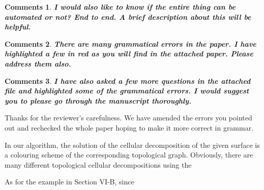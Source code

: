 \documentclass[utf8]{article}
\newtheorem{theorem}{Comments}[section]
\begin{document}
\begin{theorem}
\textbf{I would also like to know if the entire thing can be automated or not? End to end. A brief description about this will be helpful.}
\end{theorem}


\begin{theorem}
\textbf{There are many grammatical errors in the paper. I have highlighted a few in red as you will find in the attached paper. Please address them also.}
\end{theorem}

\begin{theorem}
\textbf{I have also asked a few more questions in the attached file and highlighted some of the grammatical errors. I would suggest you to please go through the manuscript thoroughly.}
\end{theorem}

Thanks for the reviewer's carefulness. We have amended the errors you pointed out and rechecked the whole paper hoping to make it more correct in grammar. 

In our algorithm, the solution of the cellular decomposition of the given surface is a colouring scheme of the corresponding topological graph. Obviously, there are many different topological cellular decompositions using the 

As for the example in Section VI-B, since 



\newpage
\end{document}
